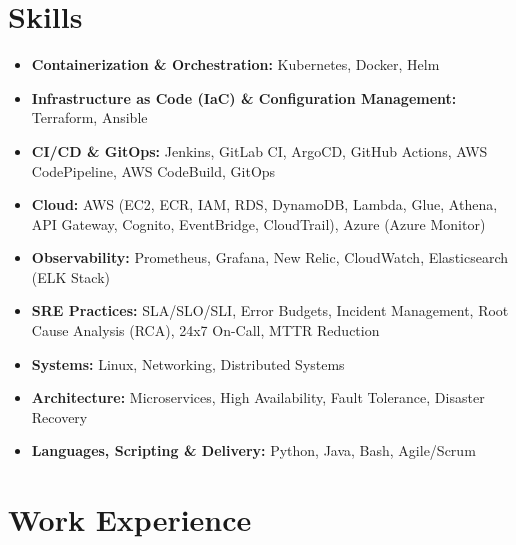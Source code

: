 \documentclass[a4paper,10.999999pt]{article}
\begin{document}
    \section{Skills}
    \begin{itemize}[leftmargin=1.35em, itemsep=0.35pt, topsep=0.3pt, parsep=0pt, label=\raisebox{0.25ex}{\tiny$\circ$}]
    \item \textbf{Containerization \& Orchestration:} Kubernetes, Docker, Helm
    \item \textbf{Infrastructure as Code (IaC) \& Configuration Management:} Terraform, Ansible
    \item \textbf{CI/CD \& GitOps:} Jenkins, GitLab CI, ArgoCD, GitHub Actions, AWS CodePipeline, AWS CodeBuild, GitOps
    \item \textbf{Cloud:} AWS (EC2, ECR, IAM, RDS, DynamoDB, Lambda, Glue, Athena, API Gateway, Cognito, EventBridge, CloudTrail), Azure (Azure Monitor)
    \item \textbf{Observability:} Prometheus, Grafana, New Relic, CloudWatch, Elasticsearch (ELK Stack)
    \item \textbf{SRE Practices:} SLA/SLO/SLI, Error Budgets, Incident Management, Root Cause Analysis (RCA), 24x7 On-Call, MTTR Reduction
    \item \textbf{Systems:} Linux, Networking, Distributed Systems
    \item \textbf{Architecture:} Microservices, High Availability, Fault Tolerance, Disaster Recovery
    \item \textbf{Languages, Scripting \& Delivery:} Python, Java, Bash, Agile/Scrum
    \end{itemize}


    \section{Work Experience}
\end{document}
